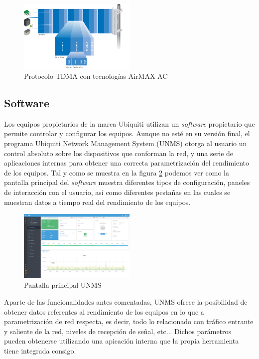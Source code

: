 \begin{figure}[H]
		\centering
		\includegraphics[width=0.5\textwidth]{img/tdma_ac.PNG}
		\caption{Protocolo TDMA con tecnologías AirMAX AC}
		\label{tdma_ac}
\end{figure}
	
\subsection{Software}
Los equipos propietarios de la marca Ubiquiti utilizan un \textit{software} propietario que permite controlar y configurar los equipos. Aunque no esté en su versión final, el programa Ubiquiti Network Management System (UNMS) otorga al usuario un control absoluto sobre los dispositivos que conforman la red, y una serie de aplicaciones internas para obtener una correcta parametrización del rendimiento de los equipos. Tal y como se muestra en la figura \ref{unms} podemos ver como la pantalla principal del \textit{software} muestra diferentes tipos de configuración, paneles de interacción con el usuario, así como diferentes pestañas en las cuales se muestran datos a tiempo real del rendimiento de los equipos. 

\begin{figure}[H]
		\centering
		\includegraphics[width=0.5\textwidth]{img/unms.png}
		\caption{Pantalla principal UNMS}
		\label{unms}
	\end{figure}
	
Aparte de las funcionalidades antes comentadas, UNMS ofrece la posibilidad de obtener datos referentes al rendimiento de los equipos en lo que a parametrización de red respecta, es decir, todo lo relacionado con tráfico entrante y saliente de la red, niveles de recepción de señal, etc... Dichos parámetros pueden obtenerse utilizando una apicación interna que la propia herramienta tiene integrada consigo.

